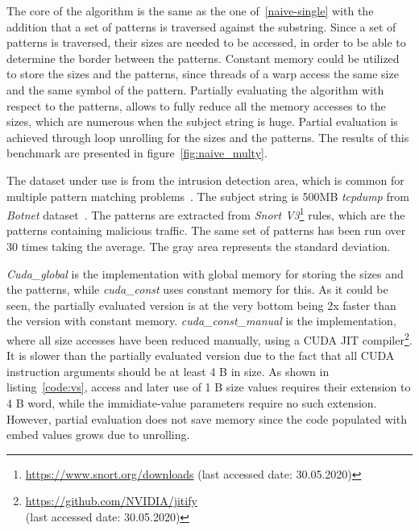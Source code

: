 The core of the algorithm is the same as the one of~\ref{naive-single} with the addition that a set of patterns is traversed against the substring. Since a set of patterns is traversed, their sizes are needed to be accessed, in order to be able to determine the border between the patterns. Constant memory could be utilized to store the sizes and the patterns, since threads of a warp access the same size and the same symbol of the pattern. Partially evaluating the algorithm with respect to the patterns, allows to fully reduce all the memory accesses to the sizes, which are numerous when the subject string is huge. Partial evaluation is achieved through loop unrolling for the sizes and the patterns. The results of this benchmark are presented in figure~\ref{fig:naive_multy}.

The dataset under use is from the intrusion detection area, which is common for multiple pattern matching problems~\cite{Aho-Corasick}.
The subject string is 500MB \emph{tcpdump} from \emph{Botnet}
dataset~\cite{Ring_2019}. The patterns are extracted from
\emph{Snort V3}\footnote{\url{https://www.snort.org/downloads} (last accessed date: 30.05.2020)}
rules, which are the patterns containing malicious traffic.
The same set of patterns has been run over 30 times taking the average.
The gray area represents the standard deviation.

\emph{Cuda\_global} is the implementation with global memory for storing the sizes
and the patterns, while \emph{cuda\_const} uses constant memory for this.
As it could be seen, the partially evaluated version is at the very
bottom being 2x faster than the version with constant memory.
\emph{cuda\_const\_manual} is the implementation, where all size accesses
have been reduced manually, using a CUDA JIT
compiler\footnote{\url{https://github.com/NVIDIA/jitify} \\(last accessed date: 30.05.2020)}.
It is slower than the partially evaluated version due to the fact that all CUDA instruction arguments should be at least 4 B in size.
As shown in listing~\ref{code:vs}, access and later use of 1 B size values requires their extension to 4 B word, while
the immidiate-value parameters require no such extension. However, partial evaluation does not save memory since the
code populated with embed values grows due to unrolling.

